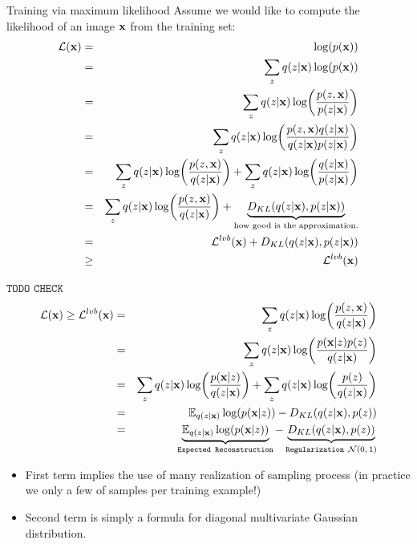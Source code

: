 \documentclass[xcolor=pdftex,dvipsnames,table,mathserif]{beamer}
\begin{document}
\begin{frame}{Training via maximum likelihood}
Assume we would like to compute the likelihood of an image $\mathbf{x}$ from the training set:
\begin{eqnarray*}
\mathcal{L}(\mathbf{x}) &=&\log(p(\mathbf{x})) \\
&=& \sum_{z} q(z|\mathbf{x}) \log(p(\mathbf{x})) \\
&=& \sum_{z} q(z|\mathbf{x}) \log(\frac{p(z,\mathbf{x})}{p(z | \mathbf{x})}) \\
&=& \sum_{z} q(z|\mathbf{x}) \log(\frac{p(z,\mathbf{x}) q(z|\mathbf{x})}{q(z|\mathbf{x}) p(z | \mathbf{x})}) \\
&=&  \sum_{z} q(z|\mathbf{x}) \log(\frac{p(z,\mathbf{x}) }{q(z|\mathbf{x})}) + \sum_{z} q(z|\mathbf{x}) \log(\frac{q(z|\mathbf{x}) }{p(z|\mathbf{x})}) \\
&=& \sum_{z} q(z|\mathbf{x}) \log(\frac{p(z,\mathbf{x}) }{q(z|\mathbf{x})})+ \underbrace{D_{KL}(q(z|\mathbf{x}),p(z|\mathbf{x}))}_{\text{how good is the approximation.}}\\
&=& \mathcal{L}^{lvb}(\mathbf{x})+D_{KL}(q(z|\mathbf{x}),p(z|\mathbf{x})) \\
&\geq& \mathcal{L}^{lvb}(\mathbf{x})
\end{eqnarray*}
\end{frame}


\begin{frame}
$ \texttt{TODO CHECK}$
\begin{eqnarray*}
 \mathcal{L}(\mathbf{x}) \geq \mathcal{L}^{lvb}(\mathbf{x}) &=& \sum_{z} q(z|\mathbf{x}) \log(\frac{p(z,\mathbf{x}) }{q(z|\mathbf{x})}) \\
 &=& \sum_{z} q(z|\mathbf{x}) \log(\frac{p(\mathbf{x} | z) p(z)}{q(z|\mathbf{x})}) \\
 &=& \sum_{z} q(z|\mathbf{x}) \log(\frac{p(\mathbf{x} | z)}{q(z|\mathbf{x})}) +  \sum_{z} q(z|\mathbf{x}) \log(\frac{p(z)}{q(z|\mathbf{x})}) \\
 &=& \mathbb{E}_{q(z|\mathbf{x})} \log(p(\mathbf{x} | z)) -D_{KL}(q(z|\mathbf{x}),p(z))\\
  &=& \underbrace{\mathbb{E}_{q(z|\mathbf{x})} \log(p(\mathbf{x} | z))}_{\texttt{Expected Reconstruction}} - \underbrace{D_{KL}(q(z|\mathbf{x}),p(z))}_{\texttt{Regularization $\mathcal{N}(0,1)$}}\\
\end{eqnarray*}
\begin{itemize}
\item First term implies the use of many realization of sampling process (in practice we only a few of samples per training example!)
\item Second term is simply a formula for diagonal multivariate Gaussian distribution.
\end{itemize}
\end{frame}
\end{document}
